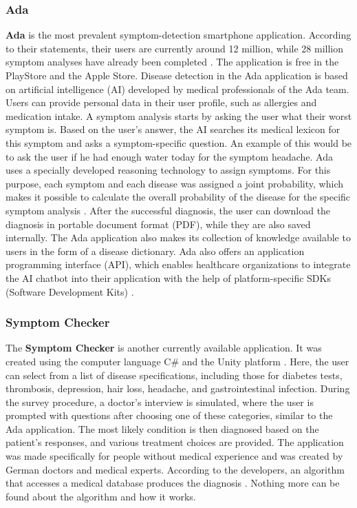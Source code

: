 \subsubsection{Ada} 
\textbf{Ada} is the most prevalent symptom-detection smartphone application. According to their statements, their users are currently around 12 million, while 28 million symptom analyses have already been completed \cite{.adaHOME}. The application is free in the PlayStore and the Apple Store. Disease detection in the Ada application is based on artificial intelligence (AI) developed by medical professionals of the Ada team. Users can provide personal data in their user profile, such as allergies and medication intake. A symptom analysis starts by asking the user what their worst symptom is. Based on the user's answer, the AI searches its medical lexicon for this symptom and asks a symptom-specific question.
An example of this would be to ask the user if he had enough water today for the symptom headache. Ada uses a specially developed reasoning technology to assign symptoms. For this purpose, each symptom and each disease was assigned a joint probability, which makes it possible to calculate the overall probability of the disease for the specific symptom analysis \cite{.adaKI}. After the successful diagnosis, the user can download the diagnosis in portable document format (PDF), while they are also saved internally. The Ada application also makes its collection of knowledge available to users in the form of a disease dictionary. Ada also offers an application programming interface (API), which enables healthcare organizations to integrate the AI chatbot into their application with the help of platform-specific SDKs (Software Development Kits)\cite{.adaFAQ} \cite{.adaDOCU}.

\subsubsection{Symptom Checker} 
The \textbf{Symptom Checker} is another currently available application. It was created using the computer language C\# and the Unity platform \cite{.symptomchecker}. Here, the user can select from a list of disease specifications, including those for diabetes tests, thrombosis, depression, hair loss, headache, and gastrointestinal infection. During the survey procedure, a doctor's interview is simulated, where the user is prompted with questions after choosing one of these categories, similar to the Ada application. The most likely condition is then diagnosed based on the patient's responses, and various treatment choices are provided. The application was made specifically for people without medical experience and was created by German doctors and medical experts. According to the developers, an algorithm that accesses a medical database produces the diagnosis \cite{.symptomchecker}. Nothing more can be found about the algorithm and how it works. 

